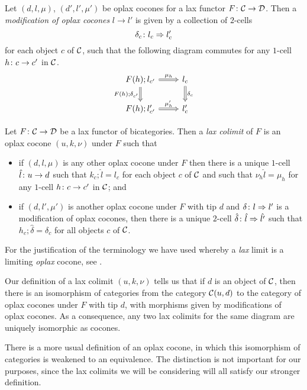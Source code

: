 \begin{definition}
  Let $(d, l, \mu)$, $(d', l', \mu')$ be oplax cocones for a lax functor $F \colon {\mathcal{C}} \to {\mathcal{D}}$.  
  Then a \emph{modification of oplax cocones} $l \to l'$ is given by a collection of $2$-cells
  \[
    \delta_c \colon l_c \Rightarrow l_c'
    \]
  for each object $c$ of ${\mathcal{C}}$, such that the following diagram commutes for any $1$-cell $h \colon c \to c'$ in ${\mathcal{C}}$.
  \[
    \begin{tikzcd}[arrows=Rightarrow]
      F(h);l_{c'} \arrow[r, "\mu_h"] \arrow[d, "F(h);\delta_{c'}"']
        & l_c \arrow[d, "\delta_c"] \\
      F(h);l_{c'}' \arrow[r, "\mu_h'"]
        & l_c'
    \end{tikzcd}
    \]
\end{definition}

\begin{definition}
  Let $F \colon {\mathcal{C}} \to {\mathcal{D}}$ be a lax functor of bicategories.  
  Then a \emph{lax colimit} of $F$ is an oplax cocone $(u,k,\nu)$ under $F$ such that 
  \begin{itemize}
    \item if $(d,l,\mu)$ is any other oplax cocone under $F$ then there is a unique $1$-cell $\hat{l} \colon u \to d$ such that $k_c;\hat{l}=l_c$ for each object $c$ of ${\mathcal{C}}$ and such that $\nu_h\hat{l}=\mu_h$ for any $1$-cell $h\colon c \to c'$ in ${\mathcal{C}}$; and
    \item if $(d,l',\mu')$ is another oplax cocone under $F$ with tip $d$ and $\delta \colon l \Rightarrow l'$ is a modification of oplax cocones, then there is a unique $2$-cell $\hat{\delta} \colon \hat{l} \Rightarrow \hat{l'}$ such that $h_c;\hat{\delta}=\delta_c$ for all objects $c$ of ${\mathcal{C}}$.
  \end{itemize}
\end{definition}

For the justification of the terminology we have used whereby a \emph{lax} limit is a limiting \emph{oplax} cocone, see \cite{nlab:2-limit}.

\begin{remark}
  Our definition of a lax colimit $(u,k,\nu)$ tells us that if $d$ is an object of ${\mathcal{C}}$, then there is an isomorphism of categories from the category ${\mathcal{C}}(u, d)$ to the category of oplax cocones under $F$ with tip $d$, with morphisms given by modifications of oplax cocones.
  As a consequence, any two lax colimits for the same diagram are uniquely isomorphic as cocones.

  There is a more usual definition of an oplax cocone, in which this isomorphism of categories is weakened to an equivalence.
  The distinction is not important for our purposes, since the lax colimits we will be considering will all satisfy our stronger definition.
\end{remark}

